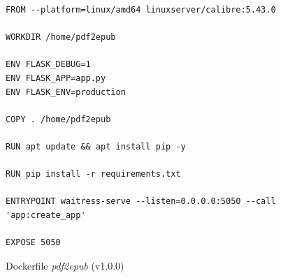 \begin{listing}[H]
\begin{verbatim}
FROM --platform=linux/amd64 linuxserver/calibre:5.43.0

WORKDIR /home/pdf2epub

ENV FLASK_DEBUG=1
ENV FLASK_APP=app.py
ENV FLASK_ENV=production

COPY . /home/pdf2epub

RUN apt update && apt install pip -y

RUN pip install -r requirements.txt

ENTRYPOINT waitress-serve --listen=0.0.0.0:5050 --call 'app:create_app'

EXPOSE 5050
\end{verbatim}
\caption{Dockerfile \textit{pdf2epub} (v1.0.0)}
\end{listing}
